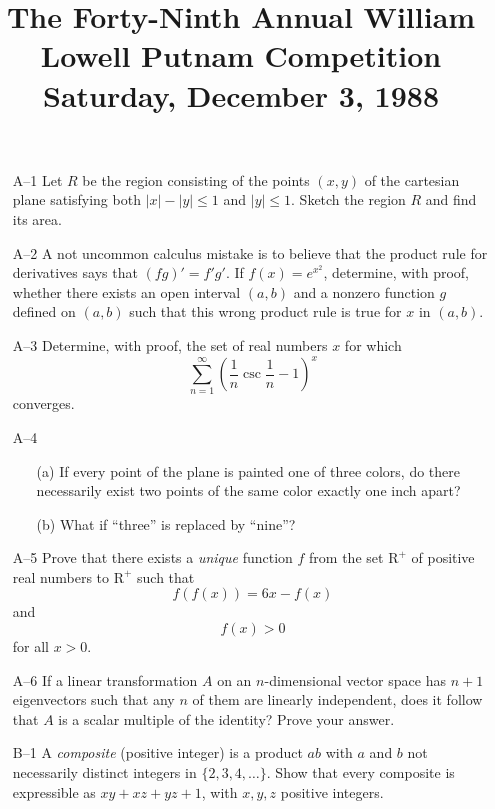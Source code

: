 \documentclass[amssymb,twocolumn,pra,10pt,aps]{revtex4-1}
\begin{document}
\title{The Forty-Ninth Annual William Lowell Putnam Competition \\
    Saturday, December 3, 1988}
\maketitle

\begin{itemize}
\item[A--1]
Let $R$ be the region consisting of the points $(x,y)$ of the
cartesian plane satisfying both $|x|-|y| \leq 1$ and $|y| \leq 1$.
Sketch the region $R$ and find its area.

\item[A--2]
A not uncommon calculus mistake is to believe that the product rule
for derivatives says that $(fg)' = f'g'$. If $f(x)=e^{x^2}$,
determine, with proof, whether there exists an open interval $(a,b)$
and a nonzero function $g$ defined on $(a,b)$ such that this wrong
product rule is true for $x$ in $(a,b)$.

\item[A--3]
Determine, with proof, the set of real numbers $x$ for which
\[
\sum_{n=1}^\infty \left( \frac{1}{n} \csc \frac{1}{n} - 1 \right)^x
\]
converges.

\item[A--4]
\begin{enumerate}
\item[(a)] If every point of the plane is painted one of three colors,
do there necessarily exist two points of the same color exactly one
inch apart?
\item[(b)] What if ``three'' is replaced by ``nine''?
\end{enumerate}

\item[A--5]
Prove that there exists a \emph{unique} function $f$ from the set
$\mathrm{R}^+$ of positive real numbers to $\mathrm{R}^+$ such that
\[
f(f(x)) = 6x-f(x)
\]
and
\[
f(x)>0
\]
for all $x>0$.

\item[A--6]
If a linear transformation $A$ on an $n$-dimensional vector space has
$n+1$ eigenvectors such that any $n$ of them are linearly independent,
does it follow that $A$ is a scalar multiple of the identity? Prove
your answer.

\item[B--1]
A \emph{composite} (positive integer) is a product $ab$ with $a$ and
$b$ not necessarily distinct integers in $\{2,3,4,\dots\}$. Show that
every composite is expressible as $xy+xz+yz+1$, with $x,y,z$ positive
integers.


\end{itemize}
\end{document}
